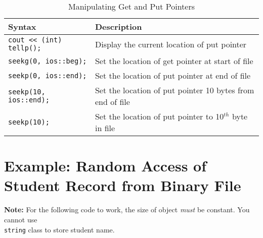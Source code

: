 \documentclass[12pt,a4paper]{article}
\begin{document}
\begin{table}[H]
\begin{center}
\vspace{0.3cm}
	\begin{tabular}{lp{9cm}}
	\hline \hline
		\textbf{Syntax} \rule{0pt}{2.6ex} & \textbf{Description}\\
		\hline
		\verb|cout << (int) tellp();| \rule{0pt}{2.6ex} & Display the current location of put pointer\\
		\verb|seekg(0, ios::beg);| \rule{0pt}{2.6ex} & Set the location of get pointer at start of file\\
		\verb|seekp(0, ios::end);| \rule{0pt}{2.6ex} & Set the location of put pointer at end of file\\
		\verb|seekp(10, ios::end);| \rule{0pt}{2.6ex} & Set the location of put pointer 10 bytes from end of file\\
		\verb|seekp(10);| \rule{0pt}{2.6ex} & Set the location of put pointer to 10$^{th}$ byte in file\\
	\hline \hline
	\end{tabular}
\end{center}
\label{ManipulatingGetandPutPointers}
\caption{Manipulating Get and Put Pointers}
\section{Example: Random Access of Student Record from Binary File}
\noindent\textbf{Note:} For the following code to work, the size of object \textit{must} be constant. You cannot use\\ \texttt{string} class to store student name.\\
\end{table}
\end{document}
